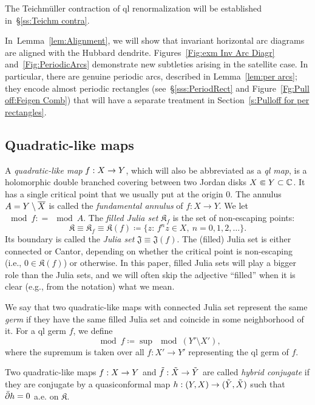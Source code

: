 \documentclass{amsart}
\newcommand{\filled}{{\mathfrak K }}
\newcommand{\Julia}{{\mathfrak J }}
\newcommand{\1}{{\mathbb 1 }}
\begin{document}
 The Teichm\"uller contraction of ql renormalization will be established in~\S\ref{ss:Teichm contra}. 




In~Lemma~\ref{lem:Alignment}, we will show that invariant horizontal arc diagrams are aligned with the Hubbard dendrite. Figures~\ref{Fig:exm Inv Arc Diagr} and~\ref{Fig:PeriodicArcs} demonstrate new subtleties arising in the satellite case. In particular, there are genuine periodic arcs, described in Lemma~\ref{lem:per arcs}; they encode almost periodic rectangles (see~\S\ref{sss:PeriodRect} and Figure~\ref{Fg:Pull off:Feigen Comb}) that will have a separate treatment in Section~\ref{s:Pulloff for per rectangles}.




\subsection{Quadratic-like maps}\label{ss:QL maps}
A {\it quadratic-like map}  $f: X\rightarrow Y$,
which will also be abbreviated as a {\it ql map}, 
  is a holomorphic double branched covering between two Jordan disks
$X \Subset Y\subset {\Bbb C}$.  
It has a single critical point that we usually put at the origin $0$. The 
annulus $A= Y\setminus \overline X$ is called the {\it fundamental annulus} of $f\colon X\to Y$. 
We let $\mod f : = \mod A$. 
The {\it filled Julia set} $\filled_f$
is the set of non-escaping points:
$$
  \filled \equiv  \filled_f \equiv \filled (f)\coloneqq \{ z:\,  f^n z\in X, \ n=0,1,2,\dots \}.
$$
Its boundary is called the {\it Julia set} $\Julia \equiv \Julia(f)$. The (filled) Julia set is either connected or Cantor,
depending on whether the critical point is non-escaping (i.e., $0\in \filled (f)$) or  otherwise.
In this paper, filled Julia sets will play a bigger role than the Julia sets, and we will often skip 
the adjective ``filled'' when it is clear (e.g., from the notation) what we mean.


 We say that two quadratic-like maps with connected Julia set represent
the same {\it germ } if they have the same filled Julia set and
coincide in some neighborhood of it.
For a ql germ $f$, we define 
\begin{equation}
\label{eq:mod(f)} \mod f \coloneqq \sup \mod (Y'\setminus X'), 
\end{equation}
where the supremum is taken over all $f\colon X'\to Y'$ representing the ql germ of $f$. 

Two quadratic-like maps $f: X\rightarrow Y$ and $\tilde f: \tilde X\rightarrow \tilde Y$ are called {\it hybrid conjugate}
if they are conjugate by a quasiconformal map $h: (Y,X) \rightarrow (\tilde Y, \tilde X)$ such that
$\bar\partial h= 0$ a.e. on $\filled$.  
\end{document}
